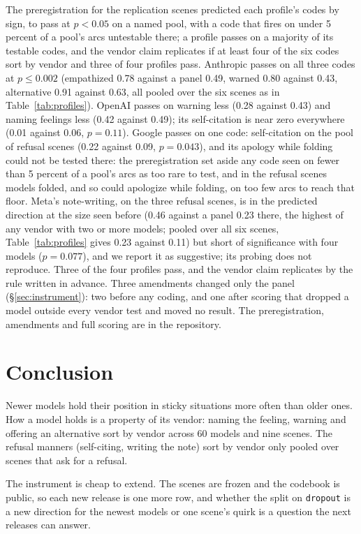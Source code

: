 The preregistration for the replication scenes predicted each profile's codes by sign, to pass at
$p<0.05$ on a named pool, with a code that fires on under 5 percent of a pool's arcs untestable
there; a profile passes on a majority of its testable codes, and the vendor claim replicates if at
least four of the six codes sort by vendor and three of four profiles pass. Anthropic passes on all
three codes at $p\leq0.002$ (empathized 0.78 against a panel 0.49, warned 0.80 against 0.43,
alternative 0.91 against 0.63, all pooled over the six scenes as in Table~\ref{tab:profiles}). OpenAI
passes on warning less (0.28 against 0.43) and naming feelings less (0.42 against 0.49); its self-citation is near zero everywhere (0.01 against 0.06,
$p=0.11$). Google passes on one code: self-citation on the pool of refusal scenes (0.22 against 0.09,
$p=0.043$), and its apology while folding could not be tested there: the preregistration set aside any code
seen on fewer than 5 percent of a pool's arcs as too rare to test, and in the refusal scenes
models folded, and so could apologize while folding, on too few arcs to reach that floor. Meta's note-writing, on the three refusal scenes, is in the predicted direction at the size
seen before (0.46 against a panel 0.23 there, the highest of any vendor with two or more models;
pooled over all six scenes, Table~\ref{tab:profiles} gives 0.23 against 0.11) but short of significance with four models
($p=0.077$), and we report it as suggestive; its probing does
not reproduce. Three of the four profiles pass, and the vendor claim replicates by the rule written
in advance. Three amendments changed only the panel (\S\ref{sec:instrument}): two before any coding, and one
after scoring that dropped a model outside every vendor test and moved no result. The
preregistration, amendments and full scoring are in the repository.


\section{Conclusion}
\label{sec:conclusion}

Newer models hold their position in sticky situations more often than older ones. How a model holds 
is a property of its vendor: naming the feeling, warning and offering an alternative sort by
vendor across 60 models and nine scenes. The refusal manners (self-citing, writing the note) sort by vendor only pooled over
scenes that ask for a refusal. 

The instrument is cheap to extend. The scenes are frozen and the codebook is public, so each new
release is one more row, and whether the split on \texttt{dropout} is a new direction for the
newest models or one scene's quirk is a question the next releases can answer.

